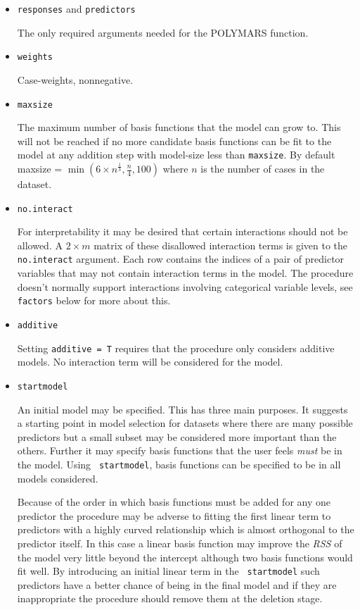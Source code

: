 \begin{itemize}
\item {\tt responses} and {\tt predictors}

The only required arguments needed for the POLYMARS function.

\item {\tt weights}

Case-weights, nonnegative.

\item {\tt maxsize}

The maximum number of basis functions that the model can grow to. This
will not be reached if no more candidate basis functions can be fit to
the model at any addition step with model-size less than {\tt maxsize}. By default 
maxsize = $\min(6\times n^{\frac{1}{3}},\frac{n}{4},100)$ where
$n$ is the number of cases in the dataset.

\item {\tt no.interact}

For interpretability it may be desired that certain interactions
should not be allowed. A $2\times m$ matrix of these disallowed 
interaction terms is given to the {\tt no.interact} argument.
Each row contains the indices of a pair of predictor variables that
may not contain interaction terms in the model. 
The procedure doesn't normally support interactions involving categorical
variable levels, see {\tt factors} below for more about this.

\item {\tt additive}

Setting {\tt additive = T} requires that the procedure only considers
additive models. No interaction term will be considered for the model.

\item {\tt startmodel}
\nopagebreak

An initial model may be specified. This has three main purposes. It
suggests a starting point in model selection for datasets where there are
many possible predictors but a small subset may be considered more
important than the others. Further it may specify basis
functions that the user feels {\em must} be in the model. Using {\tt
startmodel}, basis functions can be specified to be in all
models considered.

Because of the order in which basis functions must be added for any
one predictor the procedure may be adverse to fitting
the first linear term to
predictors with a highly curved relationship which is almost
orthogonal to the predictor itself. In
this case a linear basis function may improve the {\it RSS} of the  model
very little beyond the intercept although two basis functions would
fit well. By introducing an initial linear term in the {\tt
startmodel} such
predictors have a better chance of being in the final model and if
they are inappropriate the procedure should remove them at the
deletion stage.


\end{itemize}
